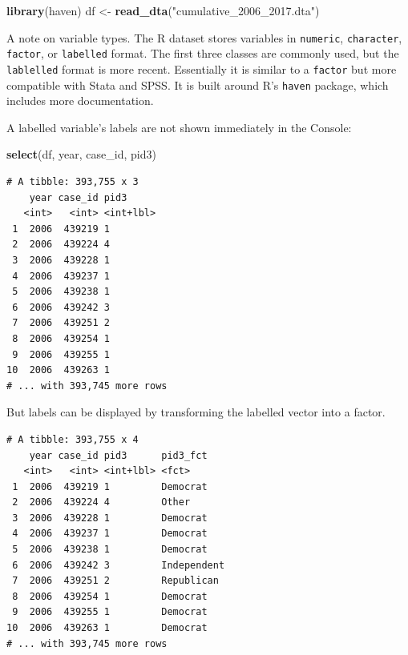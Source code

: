 \documentclass[10pt,article,oneside]{memoir}
\theoremstyle{definition}
\newenvironment{Shaded}{\begin{snugshade}}{\end{snugshade}}
\newcommand{\DataTypeTok}[1]{\textcolor[rgb]{0.13,0.29,0.53}{#1}}
\newcommand{\KeywordTok}[1]{\textcolor[rgb]{0.13,0.29,0.53}{\textbf{#1}}}
\newcommand{\NormalTok}[1]{#1}
\newcommand{\OperatorTok}[1]{\textcolor[rgb]{0.81,0.36,0.00}{\textbf{#1}}}
\newcommand{\StringTok}[1]{\textcolor[rgb]{0.31,0.60,0.02}{#1}}
\begin{document}
\begin{Shaded}
\begin{Highlighting}[]
\KeywordTok{library}\NormalTok{(haven)}
\NormalTok{df <-}\StringTok{ }\KeywordTok{read_dta}\NormalTok{(}\StringTok{"cumulative_2006_2017.dta"}\NormalTok{)}
\end{Highlighting}
\end{Shaded}

A note on variable types. The R dataset stores variables in
\texttt{numeric}, \texttt{character}, \texttt{factor}, or
\texttt{labelled} format. The first three classes are commonly used, but
the \texttt{lablelled} format is more recent. Essentially it is similar
to a \texttt{factor} but more compatible with Stata and SPSS. It is
built around R's \texttt{haven} package, which includes more
documentation.

A labelled variable's labels are not shown immediately in the Console:

\begin{Shaded}
\begin{Highlighting}[]
\KeywordTok{select}\NormalTok{(df, year, case_id, pid3)}
\end{Highlighting}
\end{Shaded}

\begin{verbatim}
# A tibble: 393,755 x 3
    year case_id pid3     
   <int>   <int> <int+lbl>
 1  2006  439219 1        
 2  2006  439224 4        
 3  2006  439228 1        
 4  2006  439237 1        
 5  2006  439238 1        
 6  2006  439242 3        
 7  2006  439251 2        
 8  2006  439254 1        
 9  2006  439255 1        
10  2006  439263 1        
# ... with 393,745 more rows
\end{verbatim}

But labels can be displayed by transforming the labelled vector into a
factor.

\begin{Shaded}
\end{Shaded}

\begin{verbatim}
# A tibble: 393,755 x 4
    year case_id pid3      pid3_fct   
   <int>   <int> <int+lbl> <fct>      
 1  2006  439219 1         Democrat   
 2  2006  439224 4         Other      
 3  2006  439228 1         Democrat   
 4  2006  439237 1         Democrat   
 5  2006  439238 1         Democrat   
 6  2006  439242 3         Independent
 7  2006  439251 2         Republican 
 8  2006  439254 1         Democrat   
 9  2006  439255 1         Democrat   
10  2006  439263 1         Democrat   
# ... with 393,745 more rows
\end{verbatim}
\end{document}
